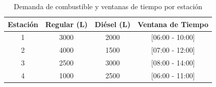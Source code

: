 \begin{table}[H]
\centering
\caption{Demanda de combustible y ventanas de tiempo por estación}
\begin{tabular}{cccc}
\toprule
Estación & Regular (L) & Diésel (L) & Ventana de Tiempo \\
\midrule
1 & 3000 & 2000 & [06:00 - 10:00] \\
2 & 4000 & 1500 & [07:00 - 12:00] \\
3 & 2500 & 3000 & [08:00 - 14:00] \\
4 & 1000 & 2500 & [06:00 - 11:00] \\
\bottomrule
\end{tabular}
\end{table}